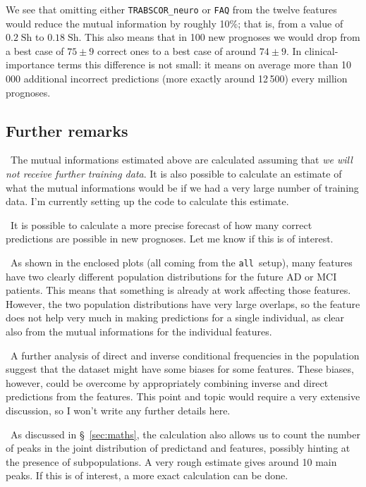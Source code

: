\documentclass[\ifafour a4paper,12pt,\else a5paper,10pt,\fi%
onecolumn,oneside,article,%
british%
]{memoir}
\theoremstyle{remark}
\theoremstyle{innote}
\renewcommand*{\|}[1][]{\nonscript\:#1\vert\nonscript\:\mathopen{}}
\newcommand*{\sect}{\S}%
\newcommand*{\bit}{\textrm{Sh}}
\newcommand*{\all}{\texttt{all}}
\begin{document}
We see that omitting either \texttt{TRABSCOR\_neuro} or \texttt{FAQ} from
the twelve features would reduce the mutual information by roughly 10\%;
that is, from a value of $0.2\;\bit$ to $0.18\;\bit$. This also means that
in 100 new prognoses we would drop from a best case of $75\pm 9$ correct
ones to a best case of around $74\pm 9$. In clinical-importance terms this
difference is not small: it means on average more than 10\,000 additional
incorrect predictions (more exactly around 12\,500) every million
prognoses.

\subsection{Further remarks}
\label{sec:remarks}

\textbullet\ The mutual informations estimated above are calculated
assuming that \emph{we will not receive further training data}. It is also
possible to calculate an estimate of what the mutual informations would be
if we had a very large number of training data. I'm currently setting up
the code to calculate this estimate.

\medskip

\noindent\textbullet\ It is possible to calculate a more precise forecast
of how many correct predictions are possible in new prognoses. Let me know
if this is of interest.

\medskip

\noindent\textbullet\ As shown in the enclosed plots (all coming from the \all\ setup), many
features have two clearly different population distributions for the future
AD or MCI patients. This means that something is already at work affecting
those features. However, the two population distributions have very large
overlaps, so the feature does not help very much in making predictions for
a single individual, as clear also from the mutual informations for the
individual features.

\medskip

\noindent\textbullet\ A further analysis of direct and inverse conditional
frequencies in the population suggest that the dataset might have some
biases for some features. These biases, however, could be overcome by
appropriately combining inverse and direct predictions from the features.
This point and topic would require a very extensive discussion, so I won't
write any further details here.

\medskip

\noindent\textbullet\ As discussed in \sect~\ref{sec:maths}, the calculation also allows us to
count the number of peaks in the joint distribution of predictand and
features, possibly hinting at the presence of subpopulations. A very rough
estimate gives around 10 main peaks. If this is of interest, a more exact
calculation can be done.
\end{document}
